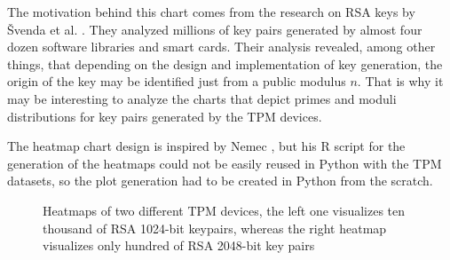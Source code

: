 The motivation behind this chart comes from the research on RSA keys by Švenda et al. \cite{svenda-1mrsa_usenix2016}. They analyzed millions of key pairs generated by almost four dozen software libraries and smart cards. Their analysis revealed, among other things, that depending on the design and implementation of key generation, the origin of the key may be identified just from a public modulus $n$. That is why it may be interesting to analyze the charts that depict primes and moduli distributions for key pairs generated by the TPM devices.

The heatmap chart design is inspired by Nemec \cite{Nemec2016thesis}, but his R script for the generation of the heatmaps could not be easily reused in Python with the TPM datasets, so the plot generation had to be created in Python from the scratch.

\begin{figure}[H]
  \centering
  \hfill
  \caption{Heatmaps of two different TPM devices, the left one visualizes ten thousand of RSA 1024-bit keypairs, whereas the right heatmap visualizes only hundred of RSA 2048-bit key pairs}
\end{figure}



